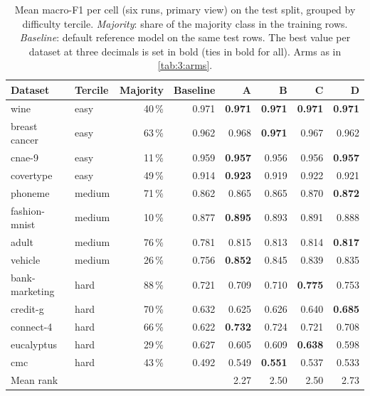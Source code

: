 \begin{table}[htbp]
  \centering
  \small
  \caption[Mean macro-F1 per cell]{Mean macro-F1 per cell (six runs, primary view) on the test split, grouped by difficulty tercile. \emph{Majority}: share of the majority class in the training rows. \emph{Baseline}: default reference model on the same test rows. The best value per dataset at three decimals is set in bold (ties in bold for all). Arms as in \autoref{tab:3:arms}.}
  \label{tab:6:f1cells}
  \begin{tabular}{llrrrrrr}
    \toprule
    Dataset & Tercile & Majority & Baseline & A & B & C & D \\
    \midrule
    wine & easy & 40\,\% & 0.971 & \textbf{0.971} & \textbf{0.971} & \textbf{0.971} & \textbf{0.971} \\
    breast cancer & easy & 63\,\% & 0.962 & 0.968 & \textbf{0.971} & 0.967 & 0.962 \\
    cnae-9 & easy & 11\,\% & 0.959 & \textbf{0.957} & 0.956 & 0.956 & \textbf{0.957} \\
    covertype & easy & 49\,\% & 0.914 & \textbf{0.923} & 0.919 & 0.922 & 0.921 \\
    \midrule
    phoneme & medium & 71\,\% & 0.862 & 0.865 & 0.865 & 0.870 & \textbf{0.872} \\
    fashion-mnist & medium & 10\,\% & 0.877 & \textbf{0.895} & 0.893 & 0.891 & 0.888 \\
    adult & medium & 76\,\% & 0.781 & 0.815 & 0.813 & 0.814 & \textbf{0.817} \\
    vehicle & medium & 26\,\% & 0.756 & \textbf{0.852} & 0.845 & 0.839 & 0.835 \\
    \midrule
    bank-marketing & hard & 88\,\% & 0.721 & 0.709 & 0.710 & \textbf{0.775} & 0.753 \\
    credit-g & hard & 70\,\% & 0.632 & 0.625 & 0.626 & 0.640 & \textbf{0.685} \\
    connect-4 & hard & 66\,\% & 0.622 & \textbf{0.732} & 0.724 & 0.721 & 0.708 \\
    eucalyptus & hard & 29\,\% & 0.627 & 0.605 & 0.609 & \textbf{0.638} & 0.598 \\
    cmc & hard & 43\,\% & 0.492 & 0.549 & \textbf{0.551} & 0.537 & 0.533 \\
    \midrule
    Mean rank &  &  &  & 2.27 & 2.50 & 2.50 & 2.73 \\
    \bottomrule
  \end{tabular}
\end{table}
